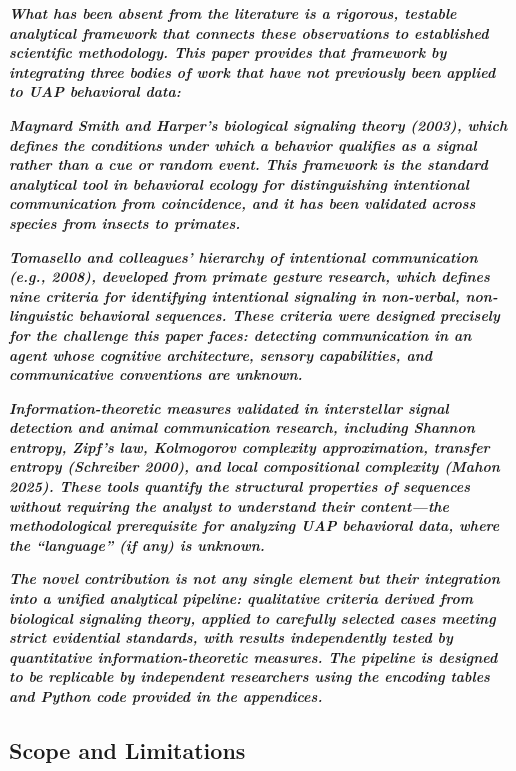 \documentclass[11pt,letterpaper]{article}
\begin{document}
\textbf{\textit{What has been absent from the literature is a rigorous, testable analytical framework that connects these observations to established scientific methodology. This paper provides that framework by integrating three bodies of work that have not previously been applied to UAP behavioral data:}}


\textbf{\textit{Maynard Smith and Harper's biological signaling theory (2003)}}\textbf{\textit{, which defines the conditions under which a behavior qualifies as a signal rather than a cue or random event. This framework is the standard analytical tool in behavioral ecology for distinguishing intentional communication from coincidence, and it has been validated across species from insects to primates.}}


\textbf{\textit{Tomasello and colleagues' hierarchy of intentional communication (e.g., 2008)}}\textbf{\textit{, developed from primate gesture research, which defines nine criteria for identifying intentional signaling in non-verbal, non-linguistic behavioral sequences. These criteria were designed precisely for the challenge this paper faces: detecting communication in an agent whose cognitive architecture, sensory capabilities, and communicative conventions are unknown.}}


\textbf{\textit{Information-theoretic measures validated in interstellar signal detection and animal communication research}}\textbf{\textit{, including Shannon entropy, Zipf's law, Kolmogorov complexity approximation, transfer entropy (Schreiber 2000), and local compositional complexity (Mahon 2025). These tools quantify the structural properties of sequences without requiring the analyst to understand their content---the methodological prerequisite for analyzing UAP behavioral data, where the ``language'' (if any) is unknown.}}


\textbf{\textit{The novel contribution is not any single element but their integration into a unified analytical pipeline: qualitative criteria derived from biological signaling theory, applied to carefully selected cases meeting strict evidential standards, with results independently tested by quantitative information-theoretic measures. The pipeline is designed to be replicable by independent researchers using the encoding tables and Python code provided in the appendices.}}


\subsection{Scope and Limitations}
\end{document}
